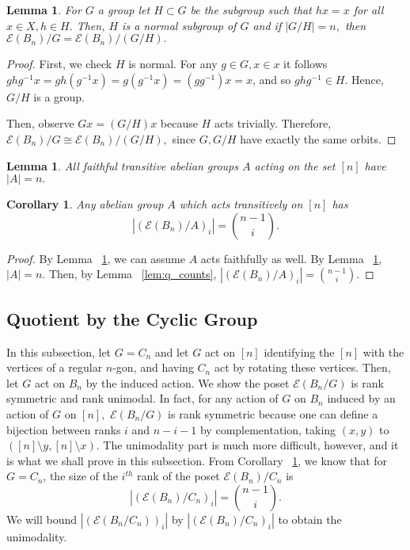 \documentclass[10 pt]{amsart}
\theoremstyle{plain}
\newtheorem{lem}[thm]{Lemma}
\newtheorem{cor}[thm]{Corollary}
\theoremstyle{definition}
\theoremstyle{remark}
\numberwithin{equation}{section}
\newcommand\ssec{\subsection}
\begin{document}
\begin{lem}
\label{lem:faithful_action}
For $G$ a group let $H \subset G$ be the subgroup such that $hx = x$ for all $x \in X,h \in H.$ Then, $H$ is a normal subgroup of $G$ and if $|G/H| = n,$ then $\mathcal E(B_n)/G =\mathcal E(B_n)/(G/H).$
\end{lem}
\begin{proof}
First, we check $H$ is normal. For any $g \in G,x \in x$ it follows $ghg^{-1}x = gh(g^{-1}x) = g(g^{-1}x) = (gg^{-1})x = x$, and so $ghg^{-1} \in H.$ Hence, $G/H$ is a group.

Then, observe $Gx = (G/H)x$ because $H$ acts trivially. Therefore, $\mathcal E(B_n)/G \cong \mathcal E(B_n)/(G/H),$ since $G,G/H$ have exactly the same orbits.
\end{proof}

\begin{lem}
\label{lem:transitive_abelian}
All faithful transitive abelian groups $A$ acting on the set $[n]$ have $|A| = n.$
\end{lem}

\begin{cor}
\label{cor:transitive_abelian_ranks}
Any abelian group $A$ which acts transitively on $[n]$ has $$|(\mathcal E (B_n)/A)_i|= \binom{n-1}{i}.$$
\end{cor}
\begin{proof}
By Lemma ~\ref{lem:faithful_action}, we can assume $A$ acts faithfully as well.
By Lemma ~\ref{lem:transitive_abelian}, $|A| = n.$ Then, by Lemma ~\ref{lem:q_counts}, $ \displaystyle |(\mathcal E (B_n)/A)_i| = \binom{n-1}{i}.$
\end{proof}






\ssec{Quotient by the Cyclic Group}
\label{sec:cyclic}

In this subsection, let $G = C_n$ and let $G$ act on $[n]$ identifying the $[n]$ with the vertices of a regular $n$-gon, and having $C_n$ act by rotating these vertices. Then, let $G$ act on $B_n$ by the induced action. We show the poset $ \mathcal E(B_n/G)$ is rank symmetric and rank unimodal. In fact, for any action of $G$ on $B_n$ induced by an action of $G$ on $[n],$ $\mathcal E(B_n/G)$ is rank symmetric because one can define a bijection between ranks $i$ and $n-i-1$ by complementation, taking $(x,y)$ to $([n]\setminus y,[n]\setminus x)$. The unimodality part is much more difficult, however, and it is what we shall prove in this subsection. From Corollary ~\ref{cor:transitive_abelian_ranks}, we know that for $G = C_n$, the size of the $i^{th}$ rank of the poset $ \mathcal E (B_n)/C_n$ is $$|( \mathcal E (B_n)/C_n)_i| = \binom{n-1}{i}.$$
We will bound $|( \mathcal E(B_n/C_n))_i|$ by  $|( \mathcal E (B_n)/C_n)_i|$ to obtain the unimodality. 
\end{document}

